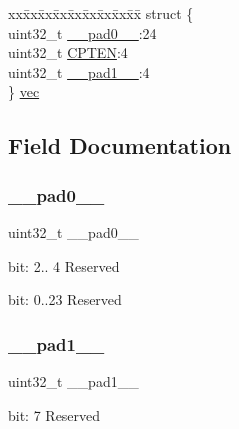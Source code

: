 \begin{DoxyCompactItemize}
\begin{tabbing}
\end{tabbing}\item 
\begin{tabbing}
xx\=xx\=xx\=xx\=xx\=xx\=xx\=xx\=xx\=\kill
struct \{\\
\>uint32\_t \mbox{\hyperlink{union_t_c_c___c_t_r_l_a___type_a3e57c2ef1c3ffb36722f000cc1156824}{\_\_pad0\_\_}}:24\\
\>uint32\_t \mbox{\hyperlink{union_t_c_c___c_t_r_l_a___type_a8754cd37c9b47743c641c6dcc500bc74}{CPTEN}}:4\\
\>uint32\_t \mbox{\hyperlink{union_t_c_c___c_t_r_l_a___type_a6712ba6dd1d5b43d2d56ff8ac4e275a7}{\_\_pad1\_\_}}:4\\
\} \mbox{\hyperlink{union_t_c_c___c_t_r_l_a___type_a7feca90b76387ddffcf43ffeea4f68aa}{vec}}\\

\end{tabbing}\end{DoxyCompactItemize}


\subsection{Field Documentation}
\mbox{\label{union_t_c_c___c_t_r_l_a___type_a3e57c2ef1c3ffb36722f000cc1156824}} 
\subsubsection{\texorpdfstring{\_\_pad0\_\_}{\_\_pad0\_\_}}
{\footnotesize\ttfamily uint32\+\_\+t \+\_\+\+\_\+pad0\+\_\+\+\_\+}

bit\+: 2.. 4 Reserved

bit\+: 0..23 Reserved \mbox{\label{union_t_c_c___c_t_r_l_a___type_a6712ba6dd1d5b43d2d56ff8ac4e275a7}} 
\subsubsection{\texorpdfstring{\_\_pad1\_\_}{\_\_pad1\_\_}}
{\footnotesize\ttfamily uint32\+\_\+t \+\_\+\+\_\+pad1\+\_\+\+\_\+}

bit\+: 7 Reserved

